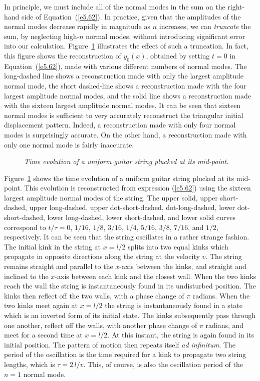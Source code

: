 In principle, we must include all of the normal modes in the sum on the right-hand side of Equation~(\ref{e5.62}). In practice, given that the amplitudes of the normal
modes decrease rapidly in magnitude as $n$ increases, we can {\em truncate}\/ the 
sum, by neglecting high-$n$ normal modes, without introducing significant error
into our calculation. Figure~\ref{f5.11} illustrates the effect of such a truncation. 
In fact, this figure shows the reconstruction of $y_0(x)$, obtained by setting $t=0$
in Equation~(\ref{e5.62}), made with various different numbers of normal modes.
The long-dashed line shows a reconstruction made with only the largest amplitude normal mode, the
short dashed-line shows a reconstruction made with the four largest amplitude
normal modes, and the solid line shows a reconstruction made with the
sixteen largest amplitude normal modes. It can be seen that sixteen normal
modes is sufficient to very accurately reconstruct the triangular
initial displacement pattern. Indeed, a reconstruction made with only four
normal modes is surprisingly accurate. On the other hand, a reconstruction made
with only one normal mode is fairly inaccurate. 

\begin{figure}
\epsfysize=3in
\centerline{}
\caption{\em Time evolution of a uniform guitar
string plucked at its mid-point.}\label{f5.11}   
\end{figure}

Figure~\ref{f5.11} shows the time evolution of a uniform guitar
string plucked at its mid-point. This evolution is reconstructed from expression (\ref{e5.62}) using the sixteen
largest amplitude normal modes of the string. The upper solid, upper short-dashed, upper long-dashed, upper dot-short-dashed,
dot-long-dashed, lower dot-short-dashed, lower long-dashed, lower short-dashed,
and lower solid curves correspond to $t/\tau = 0$, $1/16$, $1/8$, $3/16$, $1/4$, $5/16$, 
$3/8$, $7/16$, and $1/2$, respectively. It can be seen that the string oscillates in
a rather strange fashion. The initial kink in the string at $x=l/2$ splits into two
equal kinks which propagate in opposite directions along the string at the velocity $v$.
The string remains straight and parallel to the $x$-axis between the kinks, and straight and inclined to the $x$-axis between each kink and the closest wall. When the two
kinks reach the wall the string is instantaneously found in its undisturbed position. The
kinks then reflect off the two walls, with a phase change of $\pi$ radians. When the
two kinks meet again at $x=l/2$ the string is instantaneously found in a state which is an inverted form of its
initial state. The kinks subsequently pass through one another, reflect off the walls, with another phase change of $\pi$ radians, and meet for a second time at $x=l/2$. At this
instant, the string is again found in its initial position. The pattern of motion then repeats itself {\em ad infinitum}. The period of the oscillation is the time required for a kink to propagate
two string lengths, which is $\tau = 2\,l/v$. This, of course, is also the oscillation period of the
$n=1$ normal mode.


